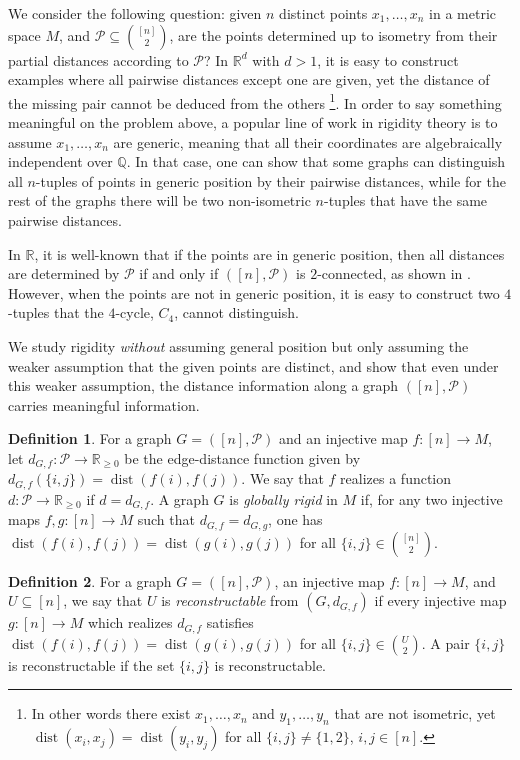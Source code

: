 \documentclass[fullpage,11pt]{article}
\newcommand{\R}{\mathbb{R}}
\providecommand{\dist}{\operatorname{dist}}
\theoremstyle{break}
\theoremstyle{definition}
\newtheorem*{definition}{Definition}
\theoremstyle{break}
\begin{document}
We consider the following question: given $n$ distinct points $x_1,\ldots,x_n$ in a metric space $M$, and $\mathcal{P} \subseteq \binom{[n]}{2}$, are the points determined up to isometry from their partial distances according to $\mathcal{P}$? In $\R^d$ with $d>1$, it is easy to construct examples where all pairwise distances except one are given, yet the distance of the missing pair cannot be deduced from the others \footnote{In other words there exist $x_1,\ldots,x_n$ and $y_1,\ldots,y_n$ that are not isometric, yet $\dist(x_i,x_j)=\dist(y_i,y_j)$ for all $\{i,j\}\neq\{1,2\}$, $i,j \in [n]$.}. In order to say something meaningful on the problem above, a popular line of work in rigidity theory is to assume $x_1,\ldots, x_n$ are generic, meaning that all their coordinates are algebraically independent over $\mathbb{Q}$. In that case, one can show that some graphs can distinguish all $n$-tuples of points in generic position by their pairwise distances, while for the rest of the graphs there will be two non-isometric $n$-tuples that have the same pairwise distances.

In $\R$, it is well-known that if the points are in generic position, then all distances are determined by $\mathcal{P}$ if and only if $([n],\mathcal{P})$ is $2$-connected, as shown in \cite{global_rigidity_chap}. However, when the points are not in generic position, it is easy to construct two $4$-tuples that the $4$-cycle, $C_4$, cannot distinguish.

We study rigidity \emph{without} assuming general position but only assuming the weaker assumption that the given points are distinct, and show that even under this weaker assumption, the distance information along a graph $([n],\mathcal{P})$ carries meaningful information.

\begin{definition}
For a graph $G=([n],\mathcal{P})$ and an injective map $f \colon [n] \to M$, let $d_{G,f} \colon \mathcal{P} \to \mathbb{R}_{\geq 0}$ be the edge-distance function given by $d_{G,f}(\{i,j\})=\dist(f(i),f(j))$. We say that $f$ realizes a function $d \colon \mathcal{P}\to \mathbb{R}_{\geq 0}$ if $d=d_{G,f}$. A graph $G$ is \emph{globally rigid} in $M$ if, for any two injective maps $f,g \colon [n]\to M$ such that $d_{G,f}=d_{G,g}$, one has $\dist(f(i),f(j))=\dist(g(i),g(j))$ for all $\{i,j\}\in \binom{[n]}{2}$.
\end{definition}

\begin{definition}
For a graph $G=([n],\mathcal{P})$, an injective map $f \colon [n]\to M$, and $U\subseteq [n]$, we say that $U$ is \emph{reconstructable} from $(G,d_{G,f})$ if every injective map $g\colon [n]\to M$ which realizes $d_{G,f}$ satisfies $\dist(f(i),f(j))=\dist(g(i),g(j))$ for all $\{i,j\}\in \binom{U}{2}$. A pair $\{i,j\}$ is reconstructable if the set $\{i,j\}$ is reconstructable.
\end{definition}
\end{document}

